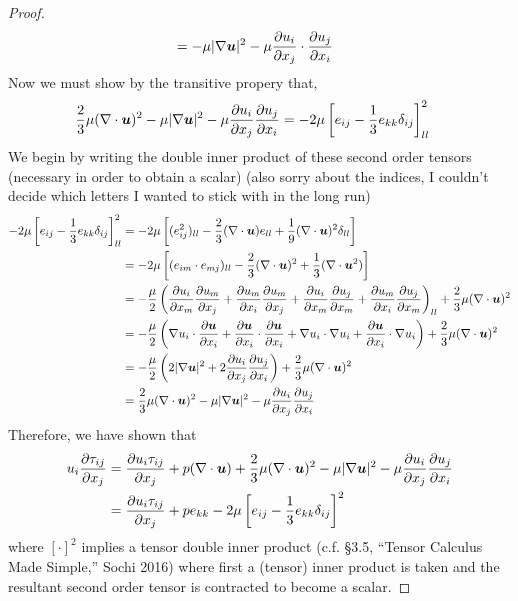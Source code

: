 \documentclass{article}
\begin{document}
\begin{proof}
\begin{align*}
        &= -\mu |\nabla\boldsymbol{u}|^2 - \mu\frac{\partial u_i}{\partial x_j}\cdot\frac{\partial u_j}{\partial x_i}
    \end{align*}
    Now we must show by the transitive propery that,
    \begin{align*}
        \frac{2}{3}\mu(\nabla \cdot{\boldsymbol{u}})^2 - \mu |\nabla\boldsymbol{u}|^2 -
        \mu\frac{\partial u_i}{\partial x_j}\frac{\partial u_j}{\partial x_i} &= -
        2\mu\left[e_{ij} - \frac{1}{3}e_{kk}\delta_{ij}\right]^2_{ll}
    \end{align*}
    We begin by writing the double inner product of these second order tensors (necessary in order to obtain a scalar) (also sorry
    about the indices, I couldn't decide which letters I wanted to stick with in
    the long run)
    \begin{align*}
        -2\mu\left[e_{ij} -
        \frac{1}{3}e_{kk}\delta_{ij}\right]^2_{ll}&=
        -2\mu\left[(e_{ij}^2)_{ll}
        - \frac{2}{3}(\nabla \cdot{\boldsymbol{u}})e_{ll} +
        \frac{1}{9}(\nabla \cdot{\boldsymbol{u}})^2\delta_{ll}\right]\\
        &=-2\mu\left[(e_{im}\cdot e_{mj})_{ll}
        -\frac{2}{3}(\nabla \cdot{\boldsymbol{u}})^2 + \frac{1}{3}(\nabla \cdot{\boldsymbol{u}}^2)\right]\\
        &= -\frac{\mu}{2}\left(\frac{\partial u_i}{\partial x_m}\frac{\partial u_m}{\partial x_j} + \frac{\partial u_m}{\partial x_i}\frac{\partial u_m}{\partial x_j} +
        \frac{\partial u_i}{\partial x_m}\frac{\partial u_j}{\partial x_m} + \frac{\partial u_m}{\partial x_i}\frac{\partial u_j}{\partial x_m}\right)_{ll} +
        \frac{2}{3}\mu(\nabla \cdot{\boldsymbol{u}})^2\\
        &=-\frac{\mu}{2}\left(\nabla u_i\cdot \frac{\partial \boldsymbol{u}}{\partial x_i} +
        \frac{\partial \boldsymbol{u}}{\partial x_i}\cdot\frac{\partial \boldsymbol{u}}{\partial x_i} + \nabla u_i\cdot\nabla u_i +
        \frac{\partial \boldsymbol{u}}{\partial x_i}\cdot\nabla u_i\right) + \frac{2}{3}\mu(\nabla \cdot{\boldsymbol{u}})^2\\
        &=-\frac{\mu}{2}\left(2|\nabla\boldsymbol{u}|^2 +
        2\frac{\partial u_i}{\partial x_j}\frac{\partial u_j}{\partial x_i}\right) + \frac{2}{3}\mu(\nabla \cdot{\boldsymbol{u}})^2\\
        &= \frac{2}{3}\mu(\nabla \cdot{\boldsymbol{u}})^2  -\mu|\nabla\boldsymbol{u}|^2 - \mu\frac{\partial u_i}{\partial x_j}\frac{\partial u_j}{\partial x_i}
    \end{align*}
    Therefore, we have shown that 
    \begin{align*}
        u_i\frac{\partial \tau_{ij}}{\partial x_j} &= \frac{\partial u_i\tau_{ij}}{\partial x_j} + p(\nabla \cdot{\boldsymbol{u}}) +
        \frac{2}{3}\mu(\nabla \cdot{\boldsymbol{u}})^2 - \mu|\nabla\boldsymbol{u}|^2 -
        \mu\frac{\partial u_i}{\partial x_j}\frac{\partial u_j}{\partial x_i}\\
        &= \frac{\partial u_i\tau_{ij}}{\partial x_j} + pe_{kk} - 2\mu\left[e_{ij} -
        \frac{1}{3}e_{kk}\delta_{ij}\right]^2
    \end{align*}
    where $[\cdot]^2$ implies a tensor double inner product (c.f. \S 3.5, ``Tensor
    Calculus Made Simple,'' Sochi 2016) where first a
    (tensor) inner
    product is taken and the resultant
    second order tensor is contracted to become a scalar. 
\end{proof}
\end{document}
